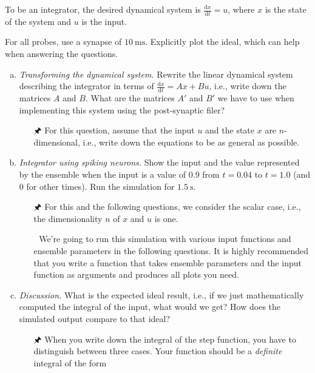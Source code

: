 	To be an integrator, the desired dynamical system is $\frac{\mathrm{d}x}{\mathrm{d}t} = u$, where $x$ is the state of the system and $u$ is the input.
	
	For all probes, use a synapse of $\SI{10}{\milli\second}$. Explicitly plot the ideal, which can help when answering the questions.

	\begin{enumerate}[a)]
		\item {} \emph{Transforming the dynamical system.} Rewrite the linear dynamical system describing the integrator in terms of $\frac{\mathrm{d}x}{\mathrm{d}t} = Ax + Bu$, i.e., write down the matrices $A$ and $B$. What are the matrices $A'$ and $B'$ we have to use when implementing this system using the post-synaptic filer?
		\begin{itemize}
			\item[{\symbolfont 🖈}] For this question, assume that the input $u$ and the state $x$ are $n$-dimensional, i.e., write down the equations to be as general as possible.
		\end{itemize}
		\item {} \emph{Integrator using spiking neurons.} Show the input and the value represented by the ensemble when the input is a value of $0.9$ from $t=0.04$ to $t=1.0$ (and $0$ for other times). Run the simulation for $\SI{1.5}{\second}$.
		\begin{itemize}
			\item[{\symbolfont 🖈}] For this and the following questions, we consider the scalar case, i.e., the dimensionality $n$ of $x$ and $u$ is one.
			\item[{\symbolfont 🐍}] We're going to run this simulation with various input functions and ensemble parameters in the following questions. It is highly recommended that you write a function that takes ensemble parameters and the input function as arguments and produces all plots you need.
		\end{itemize}
		\item {} \emph{Discussion.} What is the expected ideal result, i.e., if we just mathematically computed the integral of the input, what would we get? How does the simulated output compare to that ideal?
		\begin{itemize}
			\item[{\symbolfont 🖈}] When you write down the integral of the step function, you have to distinguish between three cases. Your function should be a \emph{definite} integral of the form
			\begin{align*}

\end{align*}
\end{itemize}
\end{enumerate}
